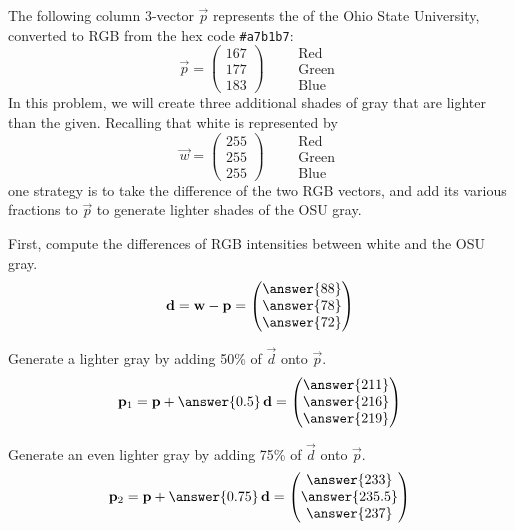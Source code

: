 \documentclass{ximera}
\author{Tae Eun Kim}
\begin{document}
\begin{exercise}
  The following column 3-vector $\vec{p}$ represents the  of the Ohio State
  University, converted to RGB from the hex code \verb|#a7b1b7|:
  \[
    \vec{p} = \begin{pmatrix}
      167\\ 177\\ 183
    \end{pmatrix}
    \qquad
    \begin{array}{l}
      \text{Red}\\
      \text{Green}\\
      \text{Blue}
    \end{array}
  \]
  In this problem, we will create three additional shades of gray that are
  lighter than the given. Recalling that white is represented by
  \[
    \vec{w} = \begin{pmatrix}
      255\\ 255\\ 255
    \end{pmatrix}
    \qquad
    \begin{array}{l}
      \text{Red}\\
      \text{Green}\\
      \text{Blue}
    \end{array}
  \]
  one strategy is to take the difference of the two RGB vectors, and
  add its various fractions to $\vec{p}$ to generate lighter shades of
  the OSU gray.

  First, compute the differences of RGB intensities between white and the OSU
  gray.
  \[
    \vec{d} = \vec{w} - \vec{p} =
    \begin{pmatrix}
      \answer{88}\\
      \answer{78}\\
      \answer{72}
    \end{pmatrix}
  \]

  Generate a lighter gray by adding 50\% of $\vec{d}$ onto $\vec{p}$.
  \[
    \vec{p}_1 = \vec{p} + \answer{0.5}\,\vec{d} =
    \begin{pmatrix}
      \answer{211}\\
      \answer{216}\\
      \answer{219}
    \end{pmatrix}
  \]

  Generate an even lighter gray by adding 75\% of $\vec{d}$
  onto $\vec{p}$.
  \[
    \vec{p}_2 = \vec{p} + \answer{0.75}\,\vec{d} =
    \begin{pmatrix}
      \answer{233}\\
      \answer{235.5}\\
      \answer{237}
    \end{pmatrix}
  \]


\end{exercise}
\end{document}
